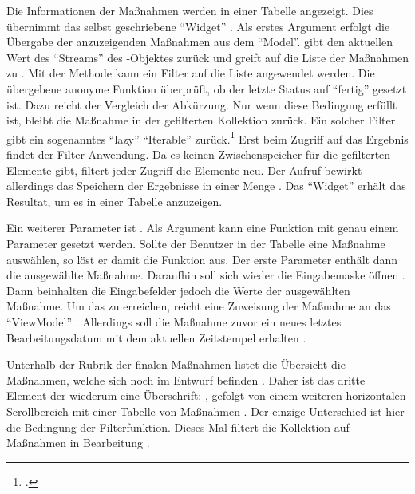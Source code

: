 Die Informationen der Maßnahmen werden in einer Tabelle angezeigt.
Dies übernimmt das selbst geschriebene \enquote{Widget}  .
Als erstes Argument erfolgt die Übergabe der anzuzeigenden Maßnahmen aus dem \enquote{Model}.
 gibt den aktuellen Wert des \enquote{Streams} des -Objektes zurück und greift auf die Liste der Maßnahmen zu .
Mit der Methode   kann ein Filter auf die Liste angewendet werden.
Die übergebene anonyme Funktion  überprüft, ob der letzte Status auf \enquote{fertig} gesetzt ist.
Dazu reicht der Vergleich der Abkürzung.
Nur wenn diese Bedingung erfüllt ist,
bleibt die Maßnahme in der gefilterten Kollektion zurück.
Ein solcher Filter gibt ein sogenanntes \enquote{lazy} \enquote{Iterable} zurück.\footcite[Vgl.][]{FlutterWhereMethod}
Erst beim Zugriff auf das Ergebnis findet der Filter Anwendung.
Da es keinen Zwischenspeicher für die gefilterten Elemente gibt,
filtert jeder Zugriff die Elemente neu.
Der Aufruf  bewirkt allerdings das Speichern der Ergebnisse in einer Menge .
Das \enquote{Widget}  erhält das Resultat,
um es in einer Tabelle anzuzeigen.

Ein weiterer Parameter ist  .
Als Argument kann eine Funktion mit genau einem Parameter gesetzt werden.
Sollte der Benutzer in der Tabelle eine Maßnahme auswählen, so löst er damit die Funktion aus.
Der erste Parameter enthält dann die ausgewählte Maßnahme.
Daraufhin soll sich wieder die Eingabemaske öffnen .
Dann beinhalten die Eingabefelder jedoch die Werte der ausgewählten Maßnahme.
Um das zu erreichen, reicht eine Zuweisung der Maßnahme an das \enquote{ViewModel} .
Allerdings soll die Maßnahme zuvor ein neues letztes Bearbeitungsdatum mit dem aktuellen Zeitstempel erhalten .

Unterhalb der Rubrik der finalen Maßnahmen listet die Übersicht die Maßnahmen, welche sich noch im Entwurf befinden .
Daher ist das dritte Element der  wiederum eine Überschrift:  , gefolgt von einem weiteren horizontalen Scrollbereich  mit einer Tabelle von Maßnahmen .
Der einzige Unterschied ist hier die Bedingung der Filterfunktion.
Dieses Mal filtert die Kollektion auf Maßnahmen in Bearbeitung .

